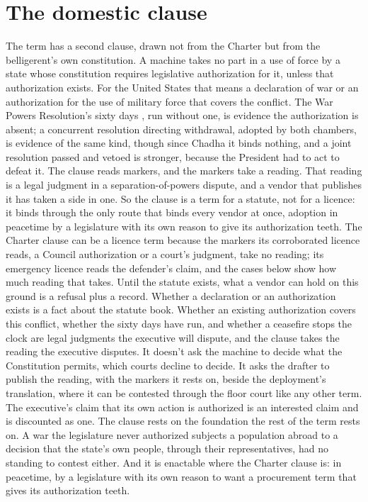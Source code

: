 \section{The domestic clause}
\label{sec:5.5}
The term has a second clause, drawn not from the Charter but from the belligerent's own constitution. A machine takes no part in a use of force by a state whose constitution requires legislative authorization for it, unless that authorization exists. For the United States that means a declaration of war or an authorization for the use of military force that covers the conflict. The War Powers Resolution's sixty days \autocite{wpr1973}, run without one, is evidence the authorization is absent; a concurrent resolution directing withdrawal, adopted by both chambers, is evidence of the same kind, though since Chadha it binds nothing, and a joint resolution passed and vetoed is stronger, because the President had to act to defeat it. The clause reads markers, and the markers take a reading. That reading is a legal judgment in a separation-of-powers dispute, and a vendor that publishes it has taken a side in one. So the clause is a term for a statute, not for a licence: it binds through the only route that binds every vendor at once, adoption in peacetime by a legislature with its own reason to give its authorization teeth. The Charter clause can be a licence term because the markers its corroborated licence reads, a Council authorization or a court's judgment, take no reading; its emergency licence reads the defender's claim, and the cases below show how much reading that takes. Until the statute exists, what a vendor can hold on this ground is a refusal plus a record. Whether a declaration or an authorization exists is a fact about the statute book. Whether an existing authorization covers this conflict, whether the sixty days have run, and whether a ceasefire stops the clock are legal judgments the executive will dispute, and the clause takes the reading the executive disputes. It doesn't ask the machine to decide what the Constitution permits, which courts decline to decide. It asks the drafter to publish the reading, with the markers it rests on, beside the deployment's translation, where it can be contested through the floor court like any other term. The executive's claim that its own action is authorized is an interested claim and is discounted as one. The clause rests on the foundation the rest of the term rests on. A war the legislature never authorized subjects a population abroad to a decision that the state's own people, through their representatives, had no standing to contest either. And it is enactable where the Charter clause is: in peacetime, by a legislature with its own reason to want a procurement term that gives its authorization teeth.

